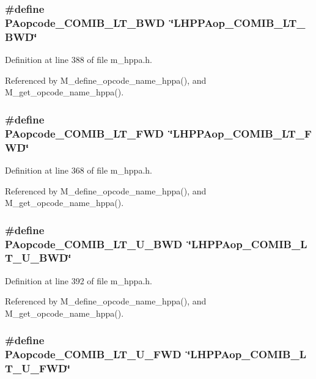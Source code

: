 \subsubsection{\setlength{\rightskip}{0pt plus 5cm}\#define PAopcode\_\-COMIB\_\-LT\_\-BWD~\char`\"{}LHPPAop\_\-COMIB\_\-LT\_\-BWD\char`\"{}}\label{m__hppa_8h_eb4b9a8de90751aa5b3cd66590ec4140}




Definition at line 388 of file m\_\-hppa.h.

Referenced by M\_\-define\_\-opcode\_\-name\_\-hppa(), and M\_\-get\_\-opcode\_\-name\_\-hppa().
\subsubsection{\setlength{\rightskip}{0pt plus 5cm}\#define PAopcode\_\-COMIB\_\-LT\_\-FWD~\char`\"{}LHPPAop\_\-COMIB\_\-LT\_\-FWD\char`\"{}}\label{m__hppa_8h_b945f3206ffb682de9ba4f59dc83f0f8}




Definition at line 368 of file m\_\-hppa.h.

Referenced by M\_\-define\_\-opcode\_\-name\_\-hppa(), and M\_\-get\_\-opcode\_\-name\_\-hppa().
\subsubsection{\setlength{\rightskip}{0pt plus 5cm}\#define PAopcode\_\-COMIB\_\-LT\_\-U\_\-BWD~\char`\"{}LHPPAop\_\-COMIB\_\-LT\_\-U\_\-BWD\char`\"{}}\label{m__hppa_8h_be90094bd89287a65e13c5aca20477ff}




Definition at line 392 of file m\_\-hppa.h.

Referenced by M\_\-define\_\-opcode\_\-name\_\-hppa(), and M\_\-get\_\-opcode\_\-name\_\-hppa().
\subsubsection{\setlength{\rightskip}{0pt plus 5cm}\#define PAopcode\_\-COMIB\_\-LT\_\-U\_\-FWD~\char`\"{}LHPPAop\_\-COMIB\_\-LT\_\-U\_\-FWD\char`\"{}}\label{m__hppa_8h_ba5b3495311c36b7b63c26ce0fe28939}




